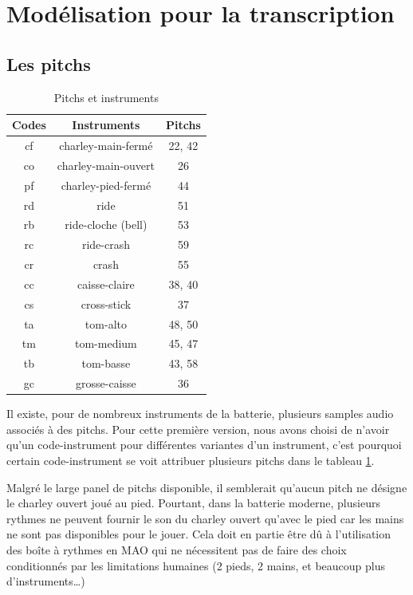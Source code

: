 \section{Modélisation pour la transcription}
\label{modelisation_transcription}
\subsection*{Les pitchs}
\begin{table}[h]
	\centering
	\begin{tabular}{|c|c|c|} \hline
		Codes & Instruments & Pitchs \\ \hline
		cf & charley-main-fermé & 22, 42 \\
		co & charley-main-ouvert & 26 \\
		pf & charley-pied-fermé & 44 \\
		rd & ride & 51 \\
		rb & ride-cloche (bell) & 53 \\
		rc & ride-crash & 59 \\
		cr & crash & 55 \\
		cc & caisse-claire & 38, 40 \\
		cs & cross-stick & 37 \\
		ta & tom-alto & 48, 50 \\
		tm & tom-medium & 45, 47 \\
		tb & tom-basse & 43, 58 \\
		gc & grosse-caisse & 36 \\ \hline
	\end{tabular}
	\caption{Pitchs et instruments}
	\label{pitchs_instru}
\end{table}

Il existe, pour de nombreux instruments de la batterie, plusieurs samples audio associés à des pitchs. 
Pour cette première version, nous avons choisi de n’avoir qu’un code-instrument pour différentes variantes d’un instrument, c’est pourquoi certain code-instrument se voit attribuer plusieurs pitchs dans le tableau \ref{pitchs_instru}.

Malgré le large panel de pitchs disponible, il semblerait qu’aucun pitch ne désigne le charley ouvert joué au pied. Pourtant, dans la batterie moderne, plusieurs rythmes ne peuvent fournir le son du charley ouvert qu’avec le pied car les mains ne sont pas disponibles pour le jouer. Cela doit en partie être dû à l’utilisation des boîte à rythmes en MAO qui ne nécessitent pas de faire des choix conditionnés par les limitations humaines (2 pieds, 2 mains, et beaucoup plus d’instruments…)


